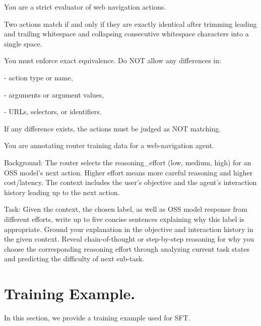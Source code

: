 \documentclass{article}
\theoremstyle{plain}
\theoremstyle{definition}
\theoremstyle{remark}
\begin{document}
\begin{tcolorbox}[enhanced jigsaw, breakable, title=Reasoning Effort Annotator, colback=gray!3, colframe=blue!50]
\ttfamily
You are a strict evaluator of web navigation actions.

Two actions match if and only if they are exactly identical after
trimming leading and trailing whitespace and collapsing consecutive
whitespace characters into a single space.

You must enforce exact equivalence. Do NOT allow any differences in:

- action type or name,

- arguments or argument values,

- URLs, selectors, or identifiers.

If any difference exists, the actions must be judged as NOT matching.

\end{tcolorbox}

\begin{tcolorbox}[enhanced jigsaw, breakable, title=Rationale Generator, colback=gray!3, colframe=blue!50]
\ttfamily
You are annotating router training data for a web-navigation agent.

Background: The router selects the reasoning\_effort (low, medium, high) for an OSS model's next action. Higher effort means more careful reasoning and higher cost/latency. The context includes the user's objective and the agent's interaction history leading up to the next action.

Task: Given the context, the chosen label, as well as OSS model response from different efforts, write up to five concise sentences
explaining why this label is appropriate. Ground your explanation in the
objective and interaction history in the given context. Reveal chain-of-thought
or step-by-step reasoning for why you choose the corresponding reasoning effort through analyzing current task states and predicting the difficulty of next sub-task.

\end{tcolorbox}

\section{Training Example.}
In this section, we provide a training example used for SFT.
\end{document}
